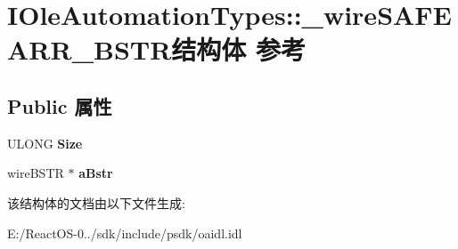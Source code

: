 \hypertarget{struct_i_ole_automation_types_1_1__wire_s_a_f_e_a_r_r___b_s_t_r}{}\section{I\+Ole\+Automation\+Types\+:\+:\+\_\+wire\+S\+A\+F\+E\+A\+R\+R\+\_\+\+B\+S\+T\+R结构体 参考}
\label{struct_i_ole_automation_types_1_1__wire_s_a_f_e_a_r_r___b_s_t_r}
\subsection*{Public 属性}
\begin{DoxyCompactItemize}
\item 
\mbox{\label{struct_i_ole_automation_types_1_1__wire_s_a_f_e_a_r_r___b_s_t_r_ac3afbe6fc6abbc20b791c06675209a11}} 
U\+L\+O\+NG {\bfseries Size}
\item 
\mbox{\label{struct_i_ole_automation_types_1_1__wire_s_a_f_e_a_r_r___b_s_t_r_a6cf8a3a9a3b1a2ddf970a0bb3d46eb66}} 
wire\+B\+S\+TR $\ast$ {\bfseries a\+Bstr}
\end{DoxyCompactItemize}


该结构体的文档由以下文件生成\+:\begin{DoxyCompactItemize}
\item 
E\+:/\+React\+O\+S-\/0../sdk/include/psdk/oaidl.\+idl\end{DoxyCompactItemize}
